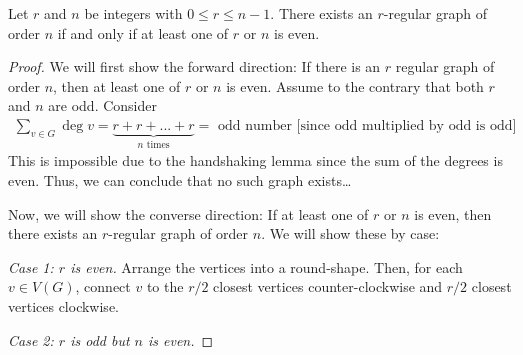 \begin{theorem}
  Let \(r\) and \(n\) be integers with \(0 \leq r \leq n-1\). There exists an
  \(r\)-regular graph of order \(n\) if and only if at least one of \(r\) or
  \(n\) is even.
\end{theorem}

\begin{proof}
  We will first show the forward direction: If there is an \(r\) regular graph
  of order \(n\), then at least one of \(r\) or \(n\) is even. Assume to the
  contrary that both \(r\) and \(n\) are odd. Consider
  \[
  \begin{aligned}
    \sum_{v \in G} \deg{v} = \underbrace{r + r + ... + r}_{\text{\(n\) times}} =
    \text{ odd number [since odd multiplied by odd is odd]}
  \end{aligned}
  \]
  This is impossible due to the handshaking lemma since the sum of the degrees
  is even. Thus, we can conclude that no such graph exists\dots

  Now, we will show the converse direction: If at least one of \(r\) or \(n\) is
  even, then there exists an \(r\)-regular graph of order \(n\). We will show
  these by case:
  
  \textit{Case 1: \(r\) is even.} Arrange the vertices into a round-shape. Then, for each \(v \in V(G)\), connect \(v\) to the \(r/2\) closest vertices counter-clockwise and \(r/2\) closest vertices clockwise.

  \textit{Case 2: \(r\) is odd but \(n\) is even.} 
\end{proof}
